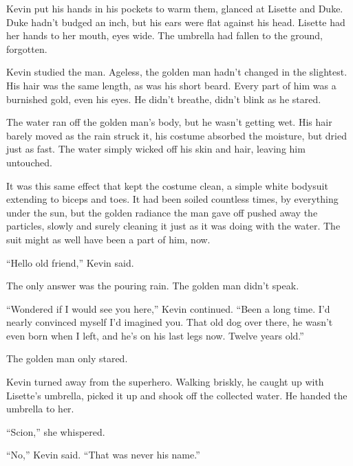 Kevin put his hands in his pockets to warm them, glanced at Lisette and Duke.  Duke hadn't budged an inch, but his ears were flat against his head.  Lisette had her hands to her mouth, eyes wide.  The umbrella had fallen to the ground, forgotten.



Kevin studied the man.  Ageless, the golden man hadn't changed in the slightest.  His hair was the same length, as was his short beard.  Every part of him was a burnished gold, even his eyes.  He didn't breathe, didn't blink as he stared.



The water ran off the golden man's body, but he wasn't getting wet.  His hair barely moved as the rain struck it, his costume absorbed the moisture, but dried just as fast.  The water simply wicked off his skin and hair, leaving him untouched.



It was this same effect that kept the costume clean, a simple white bodysuit extending to biceps and toes.  It had been soiled countless times, by everything under the sun, but the golden radiance the man gave off pushed away the particles, slowly and surely cleaning it just as it was doing with the water.  The suit might as well have been a part of him, now.



``Hello old friend,'' Kevin said.



The only answer was the pouring rain.  The golden man didn't speak.



``Wondered if I would see you here,'' Kevin continued.  ``Been a long time.  I'd nearly convinced myself I'd imagined you.  That old dog over there, he wasn't even born when I left, and he's on his last legs now.  Twelve years old.''



The golden man only stared.



Kevin turned away from the superhero.  Walking briskly, he caught up with Lisette's umbrella, picked it up and shook off the collected water.  He handed the umbrella to her.



``Scion,'' she whispered.



``No,'' Kevin said.  ``That was never his name.''



